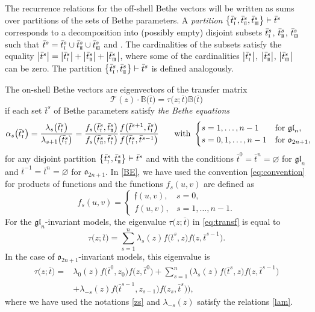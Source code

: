 \documentclass[pdftex]{sigma}
\newcommand{\so}{\scriptscriptstyle \rm I}
\newcommand{\st}{\scriptscriptstyle \rm I\hspace{-1pt}I}
\newcommand{\sth}{\scriptscriptstyle \rm I\hspace{-1pt}I\hspace{-1pt}I}
\newcommand{\bt}{{\bar t}}
\theoremstyle{definition}
\def\BB{{\mathbb{B}}}
\def\r#1{\eqref{#1}}
\def\fgo{\mathfrak{f}}
\def\eigen{\tau}
\begin{document}
The recurrence relations for the off-shell Bethe vectors will
be written as sums over partitions of the sets of Bethe parameters.
A {\it partition} $ \bigl\{\bt^s_{\so},\bt^s_{\st},\bt^s_{\sth}\bigr\}\vdash \bt^s$
corresponds to a decomposition into (possibly empty) disjoint subsets
$\bt^s_{\so}$, $\bt^s_{\st}$, $\bt^s_{\sth}$ such that
$\bt^s=\bt^s_{\so}\cup\bt^s_{\st}\cup\bt^s_{\sth}$
and \smash{$\bt^s_{\so}\cap\bt^s_{\st}=\bt^s_{\so}\cap\bt^s_{\sth}=\bt^s_{\st}\cap\bt^s_{\sth}=\varnothing$}.
The cardinalities of the subsets satisfy the equality
$
\big|\bt^s\big|=\big|\bt^s_{\so}\big|+\big|\bt^s_{\st}\big|+\big|\bt^s_{\sth}\big|$,
where some of the cardinalities $\big|\bt^s_{\so}\big|$, $\big|\bt^s_{\st}\big|$,
$\big|\bt^s_{\sth}\big|$ can be zero.
The partition $\bigl\{\bt^s_{\so},\bt^s_{\st}\bigr\}\vdash\bt^s$ is
defined analogously.


The on-shell Bethe vectors are eigenvectors of the transfer matrix
\begin{equation}\label{eq:transf}
\mathcal{T}(z)\cdot\BB\bigl(\bt\bigr)=\eigen\bigl(z;\bt\bigr) \BB\bigl(\bt\bigr)
\end{equation}
if each set $\bt^s$ of Bethe parameters satisfy {\it the Bethe equations}
\cite{KR2,Res91}
\begin{gather}
\alpha_s\bigl(\bt^s_{\so}\bigr)=\frac{\lambda_s\bigl(\bt^s_{\so}\bigr)}{\lambda_{s+1}\bigl(\bt^s_{\so}\bigr)}=
\frac{f_s\bigl(\bt^s_{\so},\bt^s_{\st}\bigr)}{f_s\bigl(\bt^s_{\st},\bt^s_{\so}\bigr)}
\frac{f\bigl(\bt^{s+1},\bt^s_{\so}\bigr)}{f\bigl(\bt^s_{\so},\bt^{s-1}\bigr)}
\qquad\!
\text{with } \begin{cases}s=1,\dots,n-1 &\text{for } \mathfrak{gl}_{n},\\
s=0,1,\dots,n-1 &\text{for } \mathfrak{o}_{2n+1},\end{cases}\!\!\!\label{BE}
\end{gather}
for any disjoint partition $\bigl\{\bt^s_{\so},\bt^s_{\st}\bigr\}\vdash\bt^s$ and with the conditions $\bt^{0} = \bt^n = \varnothing$ for $\mathfrak{gl}_{n}$ and $\bt^{-1} = \bt^n = \varnothing$ for $\mathfrak{o}_{2n+1}$.
In \r{BE}, we have used the convention \eqref{eq:convention}
for products of functions
and
the functions $f_s(u,v)$ are defined as
\[
f_s(u,v)=\begin{cases}\fgo(u,v),  &s=0,\\f(u,v),  &s=1,\dots,n-1 .
\end{cases}
\]
For the
$\mathfrak{gl}_{n}$-invariant models, the eigenvalue $\eigen\bigl(z;\bt\bigr)$ in \eqref{eq:transf}
is equal to \cite{KR2}
\[
\eigen\bigl(z;\bt\bigr)=\sum_{s=1}^n \lambda_s(z) f\bigl(\bt^s,z\bigr) f\bigl(z,\bt^{s-1}\bigr) .
\]
In the case of $\mathfrak{o}_{2n+1}$-invariant models, this eigenvalue is
\cite{LP2,Res91}
\begin{align*}
\eigen\bigl(z;\bt\bigr)={}&\lambda_0(z) f\bigl(\bt^0,z_0\bigr) f\bigl(z,\bt^0\bigr)+
\sum_{s=1}^n \bigl(\lambda_s(z) f\bigl(\bt^s,z\bigr) f\bigl(z,\bt^{s-1}\bigr)\\
&
+\lambda_{-s}(z) f\bigl(\bt^{s-1},z_{s-1}\bigr) f\bigl(z_s,\bt^{s}\bigr)\bigr) ,
\end{align*}
where we have used the notations \r{zs} and
 $\lambda_{-s}(z)$ satisfy the relations \r{lam}.
\end{document}
